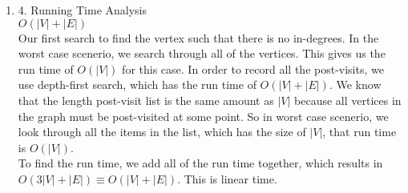 \documentclass[11pt]{article}
\newenvironment{qparts}{\begin{enumerate}[{(}a{)}]}{\end{enumerate}}
\begin{document}
\begin{qparts}
\item[4.] Running Time Analysis \\
$O(|V| + |E|)$ \\
Our first search to find the vertex such that there is no in-degrees. In the worst case scenerio, we search through all of the vertices. This gives us the run time of $O(|V|)$ for this case. In order to record all the post-visits, we use depth-first search, which has the run time of $O(|V| + |E|)$. We know that the length post-visit list is the same amount as $|V|$ because all vertices in the graph must be post-visited at some point. So in worst case scenerio, we look through all the items in the list, which has the size of $|V|$, that run time is $O(|V|)$. \\

To find the run time, we add all of the run time together, which results in $O(3|V| + |E|) \equiv O(|V| + |E|)$. This is linear time. 
\end{qparts}

\newpage
\end{document}
